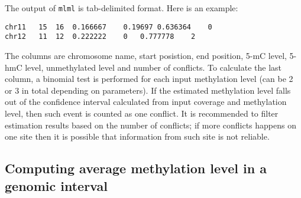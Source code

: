 \documentclass[10pt]{article}
\newcommand{\prog}[1]{\texttt{#1}}
\begin{document}
{{The output of \prog{mlml} is tab-delimited format. Here is an example:
\begin{verbatim}
chr11	15	16	0.166667	0.19697	0.636364	0 
chr12	11	12	0.222222	0	0.777778	2
\end{verbatim}
The columns are chromosome name, start posistion, end position, 5-mC level, 
5-hmC level, unmethylated level and number of conflicts. To calculate the last
column, a binomial test is performed for each input methylation level 
(can be 2 or 3 in total depending on parameters). If the estimated 
methylation level falls out of the confidence interval calculated from 
input coverage and methylation level, then such event is counted as one 
conflict. It is recommended to filter estimation results based on the number 
of conflicts; if more conflicts happens on one site then it is possible 
that information from such site is not reliable.

\subsection{Computing average methylation level in a genomic interval}
\label{sec:roimethstat}

}}
\end{document}
